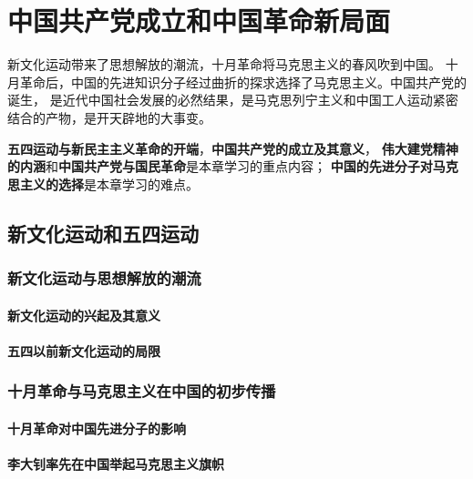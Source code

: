 \documentclass[10pt, UTF8]{book} %
\begin{document}
\newpage
\thispagestyle{empty}

\chapter{中国共产党成立和中国革命新局面}
\thispagestyle{empty}

\quad\quad 新文化运动带来了思想解放的潮流，十月革命将马克思主义的春风吹到中国。
十月革命后，中国的先进知识分子经过曲折的探求选择了马克思主义。中国共产党的诞生，
是近代中国社会发展的必然结果，是马克思列宁主义和中国工人运动紧密结合的产物，是开天辟地的大事变。

\textbf{五四运动与新民主主义革命的开端}，\textbf{中国共产党的成立及其意义}，
\textbf{伟大建党精神的内涵}和\textbf{中国共产党与国民革命}是本章学习的重点内容；
\textbf{中国的先进分子对马克思主义的选择}是本章学习的难点。


\section{新文化运动和五四运动}

\subsection{新文化运动与思想解放的潮流}

\subsubsection{新文化运动的兴起及其意义}
\subsubsection{五四以前新文化运动的局限}

\subsection{十月革命与马克思主义在中国的初步传播}

\subsubsection{十月革命对中国先进分子的影响}
\subsubsection{李大钊率先在中国举起马克思主义旗帜}
\end{document}
